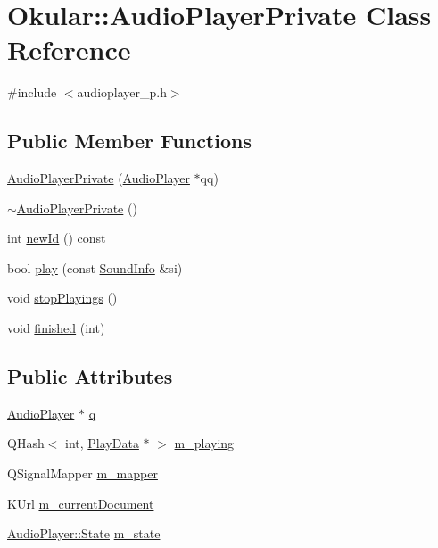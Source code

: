 \hypertarget{classOkular_1_1AudioPlayerPrivate}{\section{Okular\+:\+:Audio\+Player\+Private Class Reference}
\label{classOkular_1_1AudioPlayerPrivate}
}


{\ttfamily \#include $<$audioplayer\+\_\+p.\+h$>$}

\subsection*{Public Member Functions}
\begin{DoxyCompactItemize}
\item 
\hyperlink{classOkular_1_1AudioPlayerPrivate_a3e0f7f2671d482e8a1a7b6bf8249f4ae}{Audio\+Player\+Private} (\hyperlink{classOkular_1_1AudioPlayer}{Audio\+Player} $\ast$qq)
\item 
\hyperlink{classOkular_1_1AudioPlayerPrivate_a2e17697e3cf8c16ac3df09d8c16ea98f}{$\sim$\+Audio\+Player\+Private} ()
\item 
int \hyperlink{classOkular_1_1AudioPlayerPrivate_a4380d8616ff06dfe750f7828940ccdcc}{new\+Id} () const 
\item 
bool \hyperlink{classOkular_1_1AudioPlayerPrivate_a5c0390dceece22f9cbae179df76909ee}{play} (const \hyperlink{classSoundInfo}{Sound\+Info} \&si)
\item 
void \hyperlink{classOkular_1_1AudioPlayerPrivate_a85e116f34091a22e04aa60dce6227f23}{stop\+Playings} ()
\item 
void \hyperlink{classOkular_1_1AudioPlayerPrivate_a440e5297367c1ffa7f548263a32a700a}{finished} (int)
\end{DoxyCompactItemize}
\subsection*{Public Attributes}
\begin{DoxyCompactItemize}
\item 
\hyperlink{classOkular_1_1AudioPlayer}{Audio\+Player} $\ast$ \hyperlink{classOkular_1_1AudioPlayerPrivate_a6f941dd114ab7795d75c5e9a9c49e480}{q}
\item 
Q\+Hash$<$ int, \hyperlink{classPlayData}{Play\+Data} $\ast$ $>$ \hyperlink{classOkular_1_1AudioPlayerPrivate_adbc0d0a9187f39a4be0d8b0e3d96ce68}{m\+\_\+playing}
\item 
Q\+Signal\+Mapper \hyperlink{classOkular_1_1AudioPlayerPrivate_ad5a18424521deef41a95b0781d157821}{m\+\_\+mapper}
\item 
K\+Url \hyperlink{classOkular_1_1AudioPlayerPrivate_a086fc9c3cbe263bd8c67a6afa8b7373d}{m\+\_\+current\+Document}
\item 
\hyperlink{classOkular_1_1AudioPlayer_ab4aec223fcb227ab5cee9c525f6c5d6e}{Audio\+Player\+::\+State} \hyperlink{classOkular_1_1AudioPlayerPrivate_a3efa5829a954428660181e223342a12c}{m\+\_\+state}
\end{DoxyCompactItemize}


